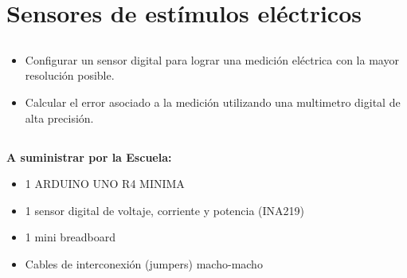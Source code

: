 \chapter{Sensores de estímulos eléctricos}
\section{\obj}
\capacidad
\begin{itemize}
    \item Configurar un sensor digital para lograr una medición eléctrica con la mayor resolución posible.
    \item Calcular el error asociado a la medición utilizando una multimetro digital de alta precisión.
\end{itemize}

\section{\mat}
\textbf{A suministrar por la Escuela:}
\begin{itemize}
    \item 1 ARDUINO UNO R4 MINIMA
    \item 1 sensor digital de voltaje, corriente y potencia (INA219)
    \item 1 mini breadboard
    \item Cables de interconexión (jumpers) macho-macho
\end{itemize}

